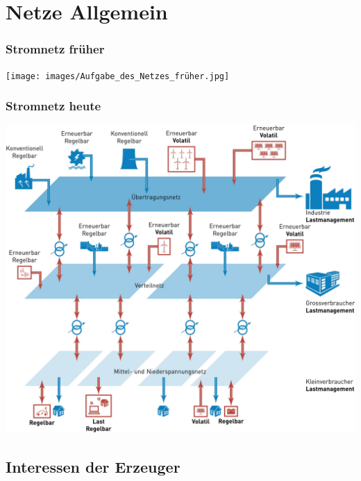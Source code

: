 \section{Netze Allgemein}


\subsubsection{Stromnetz früher}

\begin{center}
    \texttt{[image: images/Aufgabe\_des\_Netzes\_früher.jpg]}
\end{center}


\subsubsection{Stromnetz heute}

\begin{center}
    \includegraphics[width=0.95\columnwidth, align=c]{images/Aufgabe_des_Netzes_heute.jpg}
\end{center}

\subsection{Interessen der Erzeuger}

